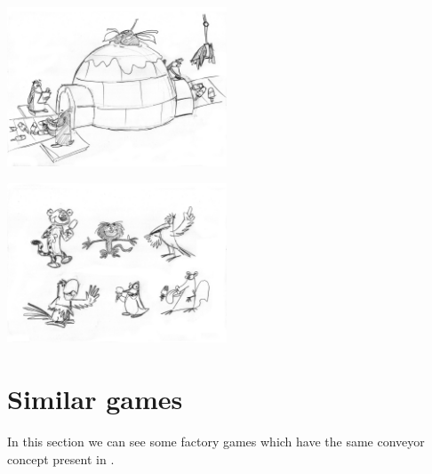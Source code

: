 \documentclass[a4paper]{scrartcl}
\begin{document}
    \begin{multicols}{2}
       \includegraphics[width=0.49\textwidth]{references/05}

       \includegraphics[width=0.49\textwidth]{references/06}
    \end{multicols}

\section{Similar games}
    In this section we can see some factory games which have the same conveyor
    concept present in \gamename.
\end{document}
